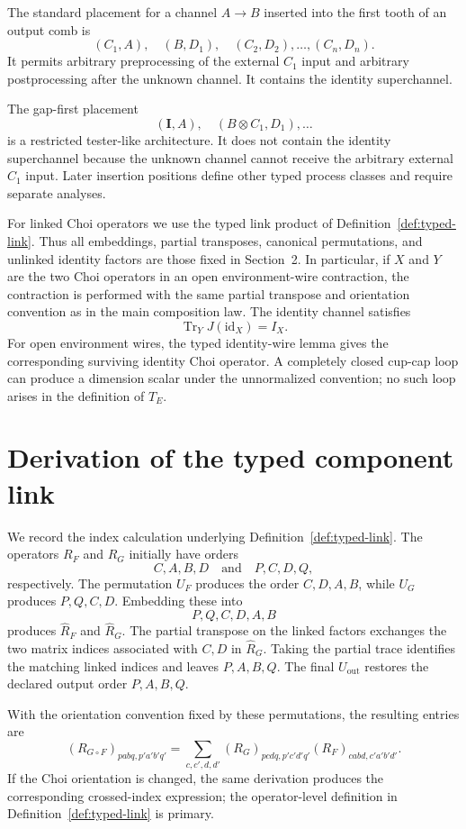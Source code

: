 \documentclass[11pt,a4paper]{article}
\theoremstyle{definition}
\theoremstyle{plain}
\theoremstyle{remark}
\DeclareMathOperator{\Tr}{Tr}
\newcommand{\id}{\mathrm{id}}
\begin{document}
The standard placement for a channel $A\to B$ inserted into the first tooth of an output comb is
\[
(C_1,A),\quad(B,D_1),\quad(C_2,D_2),\ldots,(C_n,D_n).
\]
It permits arbitrary preprocessing of the external $C_1$ input and arbitrary postprocessing after the unknown channel. It contains the identity superchannel.

The gap-first placement
\[
(\mathbf I,A),\quad(B\otimes C_1,D_1),\ldots
\]
is a restricted tester-like architecture. It does not contain the identity superchannel because the unknown channel cannot receive the arbitrary external $C_1$ input. Later insertion positions define other typed process classes and require separate analyses.

For linked Choi operators we use the typed link product of
Definition~\ref{def:typed-link}. Thus all embeddings, partial transposes,
canonical permutations, and unlinked identity factors are those fixed in
Section~2. In particular, if $X$ and $Y$ are the two Choi operators in an
open environment-wire contraction, the contraction is performed with the
same partial transpose and orientation convention as in the main
composition law. The identity channel satisfies
\[
\Tr_YJ(\id_X)=I_X.
\]
For open environment wires, the typed identity-wire lemma gives the
corresponding surviving identity Choi operator. A completely closed
cup-cap loop can produce a dimension scalar under the unnormalized
convention; no such loop arises in the definition of $T_E$.

\section{Derivation of the typed component link}
\label{app:component-link}

We record the index calculation underlying Definition~\ref{def:typed-link}.
The operators $R_F$ and $R_G$ initially have orders
\[
C,A,B,D\quad\text{and}\quad P,C,D,Q,
\]
respectively. The permutation $U_F$ produces the order $C,D,A,B$, while
$U_G$ produces $P,Q,C,D$. Embedding these into
\[
P,Q,C,D,A,B
\]
produces $\widehat R_F$ and $\widehat R_G$. The partial transpose on the
linked factors exchanges the two matrix indices associated with $C,D$ in
$\widehat R_G$. Taking the partial trace identifies the matching linked
indices and leaves $P,A,B,Q$. The final $U_{\mathrm{out}}$ restores the
declared output order $P,A,B,Q$.

With the orientation convention fixed by these permutations, the resulting
entries are
\[
(R_{G\circ F})_{pabq,p'a'b'q'}
=
\sum_{c,c',d,d'}
(R_G)_{pcdq,p'c'd'q'}
(R_F)_{cabd,c'a'b'd'}.
\]
If the Choi orientation is changed, the same derivation produces the
corresponding crossed-index expression; the operator-level definition in
Definition~\ref{def:typed-link} is primary.
\end{document}
